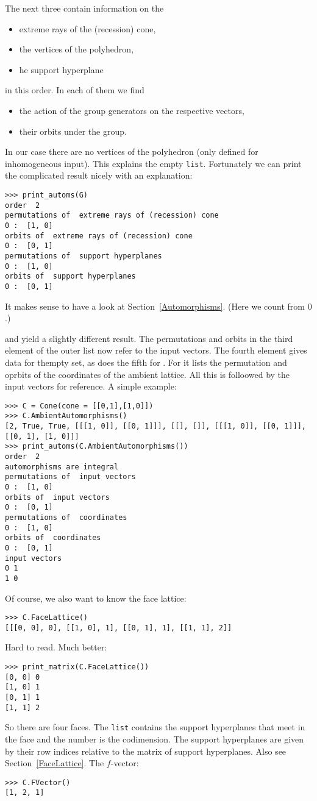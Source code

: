 \begin{small}
The next three contain information on the
\begin{itemize}
	\item extreme rays of the (recession) cone,
	\item the vertices of the polyhedron,
	\item he support hyperplane
\end{itemize}
in this order. In each of them we find
\begin{itemize}
	\item the action of the group generators on the respective vectors,
	\item their orbits under the group.
\end{itemize}
In our case there are no vertices of the polyhedron (only defined for inhomogeneous input). This explains the empty \verb|list|. Fortunately we can print the complicated result nicely with an explanation:
\begin{Verbatim}
>>> print_automs(G)
order  2
permutations of  extreme rays of (recession) cone
0 :  [1, 0]
orbits of  extreme rays of (recession) cone
0 :  [0, 1]
permutations of  support hyperplanes
0 :  [1, 0]
orbits of  support hyperplanes
0 :  [0, 1]
\end{Verbatim}
It makes sense to have a look at Section~\ref{Automorphisms}. (Here we count from $0$.)

 and  yield a slightly different result. The permutations and orbits in the third element of the outer list now refer to the input vectors. The fourth element gives data for thempty set, as does the fifth for  . For  it lists the permutation and oprbits of the coordinates of the ambient lattice. All this is folloowed by the input vectors for reference. A simple example:
\begin{Verbatim}
>>> C = Cone(cone = [[0,1],[1,0]])
>>> C.AmbientAutomorphisms()
[2, True, True, [[[1, 0]], [[0, 1]]], [[], []], [[[1, 0]], [[0, 1]]], [[0, 1], [1, 0]]]
>>> print_automs(C.AmbientAutomorphisms())
order  2
automorphisms are integral
permutations of  input vectors
0 :  [1, 0]
orbits of  input vectors
0 :  [0, 1]
permutations of  coordinates
0 :  [1, 0]
orbits of  coordinates
0 :  [0, 1]
input vectors
0 1
1 0
\end{Verbatim}
 
Of course, we also want to know the face lattice:
\begin{Verbatim}
>>> C.FaceLattice()
[[[0, 0], 0], [[1, 0], 1], [[0, 1], 1], [[1, 1], 2]]
\end{Verbatim}
Hard to read. Much better:
\begin{Verbatim}
>>> print_matrix(C.FaceLattice())
[0, 0] 0
[1, 0] 1
[0, 1] 1
[1, 1] 2
\end{Verbatim}
So there are four faces. The \verb|list| contains the support hyperplanes that meet in the face and the number is the codimension. The support hyperplanes are given by their row indices relative to the matrix of support hyperplanes. Also see Section~\ref{FaceLattice}. The $f$-vector:
\begin{Verbatim}
>>> C.FVector()
[1, 2, 1]
\end{Verbatim}


\end{small}
